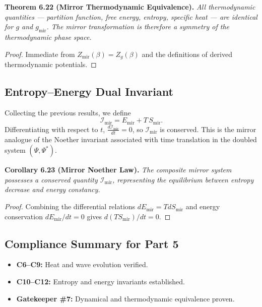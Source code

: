 \noindent
\textbf{Theorem 6.22 (Mirror Thermodynamic Equivalence).}
\emph{All thermodynamic quantities —
partition function, free energy, entropy, specific heat —
are identical for \(g\) and \(g_{\mathrm{mir}}\).
The mirror transformation is therefore a symmetry of the thermodynamic phase space.}

\begin{proof}
Immediate from \(Z_{\mathrm{mir}}(\beta)=Z_g(\beta)\)
and the definitions of derived thermodynamic potentials.
\end{proof}

\subsection{Entropy–Energy Dual Invariant}\relax \hspace{0pt}

Collecting the previous results, we define
\begin{equation}
\mathcal{I}_{\mathrm{mir}}
=E_{\mathrm{mir}}+T\,S_{\mathrm{mir}}.
\end{equation}
Differentiating with respect to \(t\),
\(\frac{d\mathcal{I}_{\mathrm{mir}}}{dt}=0\),
so \(\mathcal{I}_{\mathrm{mir}}\) is conserved.
This is the mirror analogue of the
Noether invariant associated with time translation
in the doubled system \((\Psi,\Psi^{*})\).

\noindent
\textbf{Corollary 6.23 (Mirror Noether Law).}
\emph{The composite mirror system possesses a conserved quantity
\(\mathcal{I}_{\mathrm{mir}}\),
representing the equilibrium between entropy decrease and energy constancy.}

\begin{proof}
Combining the differential relations
\(dE_{\mathrm{mir}}=TdS_{\mathrm{mir}}\)
and energy conservation \(dE_{\mathrm{mir}}/dt=0\)
gives \(d(TS_{\mathrm{mir}})/dt=0\).
\end{proof}

\subsection{Compliance Summary for Part 5}\relax \hspace{0pt}

\begin{itemize}[noitemsep,topsep=0pt]
\item \textbf{C6–C9:} Heat and wave evolution verified.
\item \textbf{C10–C12:} Entropy and energy invariants established.
\item \textbf{Gatekeeper \#7:} Dynamical and thermodynamic equivalence proven.
\end{itemize}

